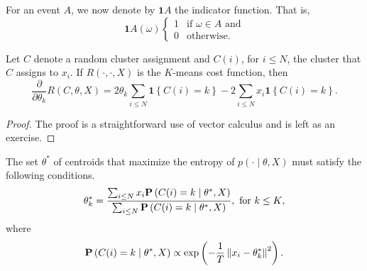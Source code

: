 For an event $A$, we now denote by $\mathbf{1}{A}$ the indicator function. That is,
%
\begin{equation}
\mathbf{1}{A}(\omega)
\begin{cases}
1 & \text{if $\omega \in A$ and}\\
0 & \text{otherwise}.
\end{cases}
\end{equation}
%

\begin{lemma}
Let $C$ denote a random cluster assignment and $C(i)$, for $i \leq N$,
the cluster that $C$ assigns to $x_i$. If $R(\cdot, \cdot, X)$ is the $K$-means cost function, then
%
\begin{equation}
\frac{\partial}{\partial \theta_k} R(C, \theta, X) = 2\theta_k \sum_{i \leq N} \mathbf{1}\left\{C(i) = k\right\} - 2\sum_{i \leq N} x_i \mathbf{1}\left\{C(i) = k\right\}.
\label{eq:deriv_cost_fun_da}
\end{equation}
%
\end{lemma}

\begin{proof}
The proof is a straightforward use of vector calculus and is left as
an exercise.
\end{proof}

\begin{theorem}
The set $\theta^*$ of centroids that maximize the entropy of $p(\cdot \mid \theta, X)$ must satisfy the following conditions.
%
\begin{equation}
\theta^*_k = \frac{\sum_{i \leq N} x_i \mathbf{P}\left(C(i) = k \mid \theta^*, X\right)}{\sum_{i \leq N} \mathbf{P}\left(C(i) = k \mid \theta^*, X\right)},\text{ for $k \leq K$},
\label{eq:thm_stationarity_conds_centroids_da}
\end{equation}
%
where
%
\begin{equation}
\mathbf{P}\left(C(i) = k \mid \theta^*, X\right) \propto \exp\left(- \frac{1}{T}\left\|x_i - \theta^*_k\right\|^2\right).
\end{equation}
%
\end{theorem}

